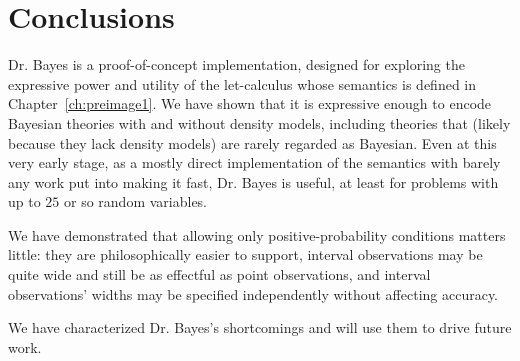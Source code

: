 \section{Conclusions}

Dr. Bayes is a proof-of-concept implementation, designed for exploring the expressive power and utility of the let-calculus whose semantics is defined in Chapter~\ref{ch:preimage1}.
We have shown that it is expressive enough to encode Bayesian theories with and without density models, including theories that (likely because they lack density models) are rarely regarded as Bayesian.
Even at this very early stage, as a mostly direct implementation of the semantics with barely any work put into making it fast, Dr. Bayes is useful, at least for problems with up to $25$ or so random variables.

We have demonstrated that allowing only positive-probability conditions matters little: they are philosophically easier to support, interval observations may be quite wide and still be as effectful as point observations, and interval observations' widths may be specified independently without affecting accuracy.

We have characterized Dr. Bayes's shortcomings and will use them to drive future work.

